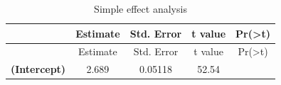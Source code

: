 \documentclass[]{article}
\begin{document}
\begin{longtable}[]{@{}ccccc@{}}
\caption{Simple effect analysis}\tabularnewline
\toprule
\begin{minipage}[b]{0.34\columnwidth}\centering\strut
~\strut
\end{minipage} & \begin{minipage}[b]{0.12\columnwidth}\centering\strut
Estimate\strut
\end{minipage} & \begin{minipage}[b]{0.15\columnwidth}\centering\strut
Std. Error\strut
\end{minipage} & \begin{minipage}[b]{0.11\columnwidth}\centering\strut
t value\strut
\end{minipage} & \begin{minipage}[b]{0.14\columnwidth}\centering\strut
Pr(\textgreater{}\textbar{}t\textbar{})\strut
\end{minipage}\tabularnewline
\midrule
\endfirsthead
\toprule
\begin{minipage}[b]{0.34\columnwidth}\centering\strut
~\strut
\end{minipage} & \begin{minipage}[b]{0.12\columnwidth}\centering\strut
Estimate\strut
\end{minipage} & \begin{minipage}[b]{0.15\columnwidth}\centering\strut
Std. Error\strut
\end{minipage} & \begin{minipage}[b]{0.11\columnwidth}\centering\strut
t value\strut
\end{minipage} & \begin{minipage}[b]{0.14\columnwidth}\centering\strut
Pr(\textgreater{}\textbar{}t\textbar{})\strut
\end{minipage}\tabularnewline
\midrule
\endhead
\begin{minipage}[t]{0.34\columnwidth}\centering\strut
\textbf{(Intercept)}\strut
\end{minipage} & \begin{minipage}[t]{0.12\columnwidth}\centering\strut
2.689\strut
\end{minipage} & \begin{minipage}[t]{0.15\columnwidth}\centering\strut
0.05118\strut
\end{minipage} & \begin{minipage}[t]{0.11\columnwidth}\centering\strut
52.54\strut
\end{minipage} & \begin{minipage}[t]{0.14\columnwidth}\centering\strut

\end{minipage}
\end{longtable}
\end{document}
